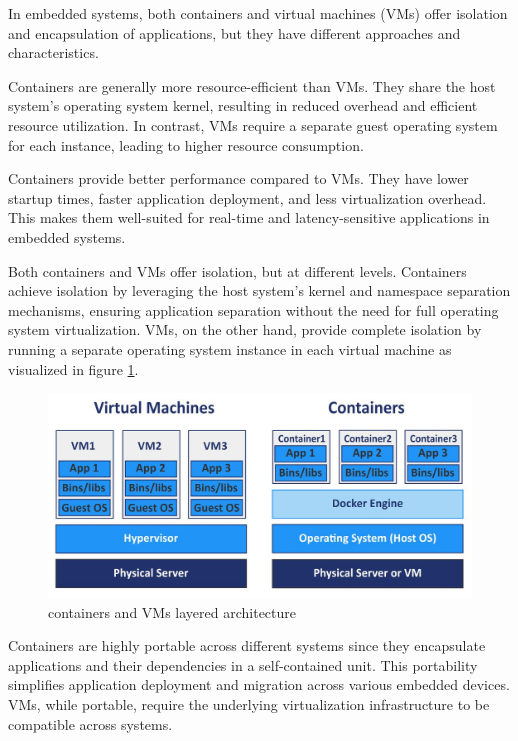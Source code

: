\documentclass[
12pt,
oneside, 
onehalfspacing, 
nolistspacing, 
parskip, 
chapterinoneline, 
]{AASTCOMPUTER}
\begin{document}
In embedded systems, both containers and virtual machines (VMs) offer isolation and encapsulation of applications, but they have different approaches and characteristics.

Containers are generally more resource-efficient than VMs. They share the host system's operating system kernel, resulting in reduced overhead and efficient resource utilization. In contrast, VMs require a separate guest operating system for each instance, leading to higher resource consumption.

Containers provide better performance compared to VMs. They have lower startup times, faster application deployment, and less virtualization overhead. This makes them well-suited for real-time and latency-sensitive applications in embedded systems.

Both containers and VMs offer isolation, but at different levels. Containers achieve isolation by leveraging the host system's kernel and namespace separation mechanisms, ensuring application separation without the need for full operating system virtualization. VMs, on the other hand, provide complete isolation by running a separate operating system instance in each virtual machine as visualized in figure \ref{fig:container_vs_vm}.


\begin{figure}[h]
\centering
\includegraphics[scale=0.5]{Figures/containervsVM.JPG}
\caption[containers and VMs layered architecture]{containers and VMs layered architecture}
\label{fig:container_vs_vm}
\end{figure}

Containers are highly portable across different systems since they encapsulate applications and their dependencies in a self-contained unit. This portability simplifies application deployment and migration across various embedded devices. VMs, while portable, require the underlying virtualization infrastructure to be compatible across systems.
\end{document}
